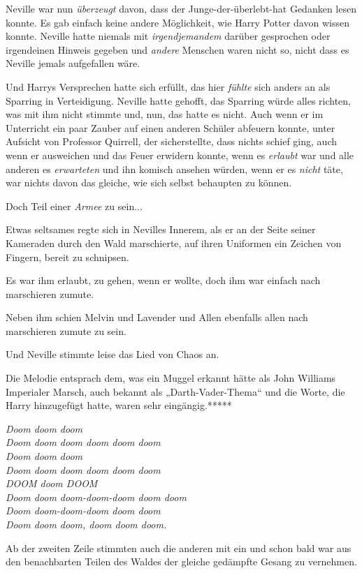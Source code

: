 {Neville war nun \emph{überzeugt} davon, dass der Junge-der-überlebt-hat Gedanken lesen konnte. Es gab einfach keine andere Möglichkeit, wie Harry Potter davon wissen konnte. Neville hatte niemals mit \emph{irgendjemandem} darüber gesprochen oder irgendeinen Hinweis gegeben und \emph{andere} Menschen waren nicht so, nicht dass es Neville jemals aufgefallen wäre.

Und Harrys Versprechen hatte sich erfüllt, das hier \emph{fühlte} sich anders an als Sparring in Verteidigung. Neville hatte gehofft, das Sparring würde alles richten, was mit ihm nicht stimmte und, nun, das hatte es nicht. Auch wenn er im Unterricht ein paar Zauber auf einen anderen Schüler abfeuern konnte, unter Aufsicht von Professor Quirrell, der sicherstellte, dass nichts schief ging, auch wenn er ausweichen und das Feuer erwidern konnte, wenn es \emph{erlaubt} war und alle anderen es \emph{erwarteten} und ihn komisch ansehen würden, wenn er es \emph{nicht} täte, war nichts davon das gleiche, wie sich selbst behaupten zu können.

Doch Teil einer \emph{Armee} zu sein...

Etwas seltsames regte sich in Nevilles Innerem, als er an der Seite seiner Kameraden durch den Wald marschierte, auf ihren Uniformen ein Zeichen von Fingern, bereit zu schnipsen.

Es war ihm erlaubt, zu gehen, wenn er wollte, doch ihm war einfach nach marschieren zumute.

Neben ihm schien Melvin und Lavender und Allen ebenfalls allen nach marschieren zumute zu sein.

Und Neville stimmte leise das Lied von Chaos an.

Die Melodie entsprach dem, was ein Muggel erkannt hätte als John Williams Imperialer Marsch, auch bekannt als „Darth-Vader-Thema“ und die Worte, die Harry hinzugefügt hatte, waren sehr eingängig.*****

\emph{Doom doom doom\\ Doom doom doom doom doom doom\\ Doom doom doom\\ Doom doom doom doom doom doom\\ DOOM doom DOOM\\ Doom doom doom-doom-doom doom doom\\ Doom doom-doom-doom doom doom\\ Doom doom doom, doom doom doom.}

Ab der zweiten Zeile stimmten auch die anderen mit ein und schon bald war aus den benachbarten Teilen des Waldes der gleiche gedämpfte Gesang zu vernehmen.

}
